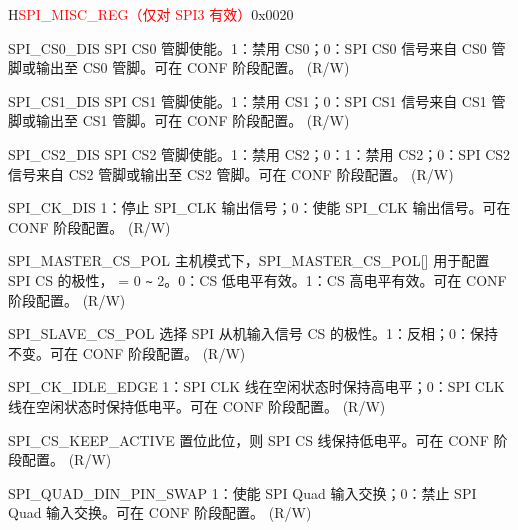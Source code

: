 \begin{register}{H}{\textcolor{red}{SPI\_MISC\_REG（仅对 SPI3 有效）}}{0x{}0020}\label{regdesc:SPI3MISCREG}
%
%
%
%
%
%
%
%
%
%
%
%
\regnewline%
\begin{regdesc}\begin{reglist}
\label{fielddesc:SPI3CS0DIS}\item [SPI\_CS0\_DIS] SPI CS0 管脚使能。1：禁用 CS0；0：SPI CS0 信号来自 CS0 管脚或输出至 CS0 管脚。可在 CONF 阶段配置。 (R/W)
\label{fielddesc:SPI3CS1DIS}\item [SPI\_CS1\_DIS] SPI CS1 管脚使能。1：禁用 CS1；0：SPI CS1 信号来自 CS1 管脚或输出至 CS1 管脚。可在 CONF 阶段配置。 (R/W)
\label{fielddesc:SPI3CS2DIS}\item [SPI\_CS2\_DIS] SPI CS2 管脚使能。1：禁用 CS2；0：1：禁用 CS2；0：SPI CS2 信号来自 CS2 管脚或输出至 CS2 管脚。可在 CONF 阶段配置。 (R/W)
\label{fielddesc:SPI3CKDIS}\item [SPI\_CK\_DIS] 1：停止 SPI\_CLK 输出信号；0：使能 SPI\_CLK 输出信号。可在 CONF 阶段配置。 (R/W)
\label{fielddesc:SPI3MASTERCSPOL}\item [SPI\_MASTER\_CS\_POL] 主机模式下，SPI\_MASTER\_CS\_POL[] 用于配置 SPI CS 的极性， = 0 \verb+~+ 2。0：CS 低电平有效。1：CS 高电平有效。可在 CONF 阶段配置。 (R/W) 
\label{fielddesc:SPI3SLAVECSPOL}\item [SPI\_SLAVE\_CS\_POL] 选择 SPI 从机输入信号 CS 的极性。1：反相；0：保持不变。可在 CONF 阶段配置。 (R/W)
\label{fielddesc:SPI3CKIDLEEDGE}\item [SPI\_CK\_IDLE\_EDGE] 1：SPI CLK 线在空闲状态时保持高电平；0：SPI CLK 线在空闲状态时保持低电平。可在 CONF 阶段配置。 (R/W)
\label{fielddesc:SPI3CSKEEPACTIVE}\item [SPI\_CS\_KEEP\_ACTIVE] 置位此位，则 SPI CS 线保持低电平。可在 CONF 阶段配置。 (R/W)
\label{fielddesc:SPI3QUADDINPINSWAP}\item [SPI\_QUAD\_DIN\_PIN\_SWAP] 1：使能 SPI Quad 输入交换；0：禁止 SPI Quad 输入交换。可在 CONF 阶段配置。 (R/W)
\end{reglist}\end{regdesc}
\end{register}


